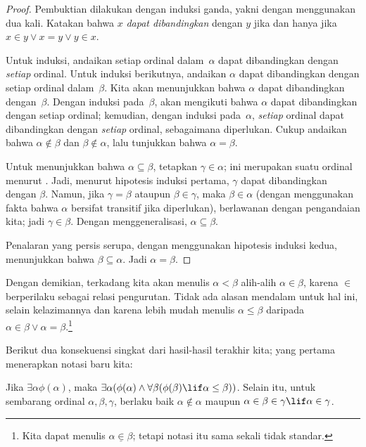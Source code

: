 \documentclass[../../../include/open-logic-section]{subfiles}
\begin{document}
\begin{proof}
Pembuktian dilakukan dengan induksi ganda, yakni dengan menggunakan
 dua kali. Katakan bahwa $x$ \emph{dapat
dibandingkan} dengan $y$ jika dan hanya jika $x \in y \lor x = y \lor y \in
x$.

Untuk induksi, andaikan setiap ordinal dalam~$\alpha$ dapat dibandingkan
dengan \emph{setiap} ordinal. Untuk induksi berikutnya, andaikan $\alpha$
dapat dibandingkan dengan setiap ordinal dalam~$\beta$. Kita akan
menunjukkan bahwa $\alpha$ dapat dibandingkan dengan~$\beta$. Dengan induksi
pada~$\beta$, akan mengikuti bahwa $\alpha$ dapat dibandingkan dengan setiap
ordinal; kemudian, dengan induksi pada~$\alpha$, \emph{setiap} ordinal dapat
dibandingkan dengan \emph{setiap} ordinal, sebagaimana diperlukan. Cukup
andaikan bahwa $\alpha \notin \beta$ dan $\beta \notin \alpha$, lalu
tunjukkan bahwa $\alpha = \beta$.

Untuk menunjukkan bahwa $\alpha \subseteq \beta$, tetapkan $\gamma \in
\alpha$; ini merupakan suatu ordinal menurut . Jadi,
menurut hipotesis induksi pertama, $\gamma$ dapat dibandingkan dengan
$\beta$. Namun, jika $\gamma = \beta$ ataupun $\beta \in \gamma$, maka
$\beta \in \alpha$ (dengan menggunakan fakta bahwa $\alpha$ bersifat
transitif jika diperlukan), berlawanan dengan pengandaian kita; jadi $\gamma
\in \beta$. Dengan menggeneralisasi, $\alpha \subseteq \beta$.

Penalaran yang persis serupa, dengan menggunakan hipotesis induksi kedua,
menunjukkan bahwa $\beta \subseteq \alpha$. Jadi $\alpha = \beta$.
\end{proof}\noindent
Dengan demikian, terkadang kita akan menulis $\alpha <\beta$ alih-alih
$\alpha \in \beta$, karena $\in$ berperilaku sebagai relasi pengurutan. Tidak
ada alasan mendalam untuk hal ini, selain kelazimannya dan karena lebih mudah
menulis $\alpha \leq \beta$ daripada $\alpha \in \beta \lor \alpha =
\beta$.\footnote{Kita dapat menulis $\alpha
\mathrel{\underline{\in}} \beta$; tetapi notasi itu sama sekali tidak
standar.}

Berikut dua konsekuensi singkat dari hasil-hasil terakhir kita; yang pertama
menerapkan notasi baru kita:

\begin{cor}
Jika $\exists \alpha\phi(\alpha)$, maka $\exists \alpha(\phi(\alpha)
\land \forall \beta(\phi(\beta) \lif \alpha \leq \beta))$.
Selain itu, untuk sembarang ordinal $\alpha, \beta, \gamma$, berlaku baik
$\alpha \notin \alpha$ maupun $\alpha \in \beta \in \gamma \lif \alpha
\in \gamma$.
\end{cor}
\end{document}
